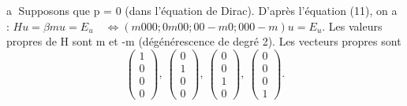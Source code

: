 \textcircled{a} Supposons que p = 0 (dans l’équation de Dirac).
D’après l’équation (11), on a : $Hu = \beta m u = E_u \quad
\Leftrightarrow (m 0 0 0 ; 0 m 0 0 ; 0 0 -m 0 ; 0 0 0 -m) u = E_u$.
Les valeurs propres de H sont m et -m (dégénérescence de degré 2).
Les vecteurs propres sont
\[ \begin{pmatrix} 1 \\ 0 \\ 0 \\ 0 \end{pmatrix},\ 
\begin{pmatrix} 0 \\ 1 \\ 0 \\ 0 \end{pmatrix},\ 
\begin{pmatrix} 0 \\ 0 \\ 1 \\ 0 \end{pmatrix},\ 
\begin{pmatrix} 0 \\ 0 \\ 0 \\ 1 \end{pmatrix}. \]



